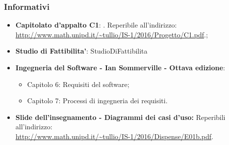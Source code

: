 \subsubsection{Informativi}
\begin{itemize}
	\item
	\textbf{Capitolato d'appalto C1}: \progetto. Reperibile all'indirizzo: \\
	\url{http://www.math.unipd.it/~tullio/IS-1/2016/Progetto/C1.pdf}.;
	\item 	
	\textbf{Studio di Fattibilita'}: StudioDiFattibilita
	\item
	\textbf{Ingegneria del Software - Ian Sommerville - Ottava edizione}:
	\begin{itemize}
		\item Capitolo 6: Requisiti del software;
		\item Capitolo 7: Processi di ingegneria dei requisiti.
	\end{itemize} 
	\item
	\textbf{Slide dell'insegnamento - Diagrammi dei casi d'uso:}  Reperibili all'indirizzo: \\ \url{http://www.math.unipd.it/~tullio/IS-1/2016/Dispense/E01b.pdf}.
\end{itemize}